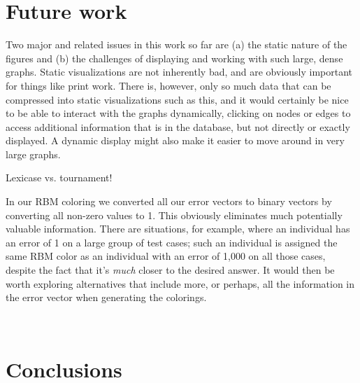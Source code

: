 \documentclass{sig-alternate}
\begin{document}
\section{Future work}
\label{sec:futurework}

Two major and related issues in this work so far are (a) the static nature of the figures and (b) the 
challenges of displaying and working with such large, dense graphs. Static visualizations are not 
inherently bad, and are obviously important for things like print work. There is, however, only so
much data that can be compressed into static visualizations such as this, and it would certainly be
nice to be able to interact with the graphs dynamically, clicking on nodes or edges to access
additional information that is in the database, but not directly or exactly displayed. A dynamic
display might also make it easier to move around in very large graphs.


Lexicase vs. tournament!

In our RBM coloring we converted all our error vectors to binary vectors by
converting all non-zero values to 1. This obviously eliminates much potentially
valuable information. There are situations, for example, where an individual has
an error of 1 on a large group of test cases; such an individual is assigned
the same RBM color as an individual with an error of 1,000 on all those cases,
despite the fact that it's \emph{much} closer to the desired answer.
It would then be worth exploring alternatives that include
more, or perhaps, all the information in the error vector when generating the
colorings.

\

\section{Conclusions}
\label{sec:conclusions}

%
%



\end{document}
